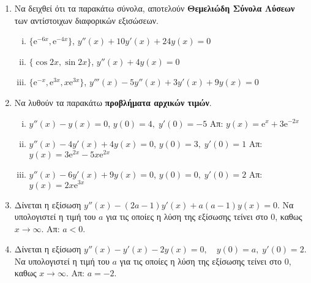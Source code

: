 


\pagestyle{askhseis}
\everymath{\displaystyle}





\begin{center}
\end{center}

\vspace{\baselineskip}

\begin{enumerate}
  \item Να δειχθεί ότι τα  παρακάτω σύνολα, αποτελούν \textbf{Θεμελιώδη Σύνολα Λύσεων} 
    των αντίστοιχων διαφορικών εξισώσεων.
    \begin{enumerate}[i)]
      \item $ \{ \mathrm{e}^{-6x}, \mathrm{e}^{-4x} \} $,\quad 
        $ y''(x)+10y'(x)+24y(x)=0 $ 
      \item $ \{ \cos{2x}, \sin{2x} \}$, \quad $ y''(x)+4y(x)=0 $
      \item $ \{ \mathrm{e}^{-x}, \mathrm{e}^{3x}, x\mathrm{e}^{3x} \} $, 
        \quad $ y'''(x)-5y''(x)+3y'(x)+9y(x)=0 $
    \end{enumerate}

  \item Να λυθούν τα παρακάτω \textbf{προβλήματα αρχικών τιμών}.
    \begin{enumerate}[i)]
      \item $ y''(x) - y(x)=0 $, \quad $ y(0)=4, \; y'(0)=-5 $ 
        \hfill Απ:  $ y(x)= \mathrm{e}^{x}+3 \mathrm{e}^{-2x} $ 
      \item $ y''(x)-4y'(x)+4y(x)=0 $, \quad $ y(0)=3, \; y'(0)=1 $ 
        \hfill Απ:  $ y(x)=3 \mathrm{e}^{2x} - 5x \mathrm{e}^{2x} $
      \item $ y''(x)-6y'(x)+9y(x)=0 $, \quad $ y(0)=0, \; y'(0)=2 $ 
        \hfill Απ:  $ y(x)=2x \mathrm{e}^{3x} $
    \end{enumerate}

  \item Δίνεται η εξίσωση $ y''(x)-(2a-1)y'(x)+a(a-1)y(x)=0 $. Να υπολογιστεί 
    η τιμή του $a$ για τις οποίες η λύση της εξίσωσης τείνει στο 0, καθως 
    $ x \to \infty $.
    \hfill Απ: $ a<0 $. 

  \item Δίνεται η εξίσωση $ y''(x)-y'(x)-2y(x)=0, \quad y(0)=a, \; y'(0)=2 $. 
    Να υπολογιστεί η τιμή του $a$ για τις οποίες η λύση της εξίσωσης τείνει στο 0, 
    καθως $ x \to \infty $.
    \hfill Απ: $ a=-2 $. 


\end{enumerate}
